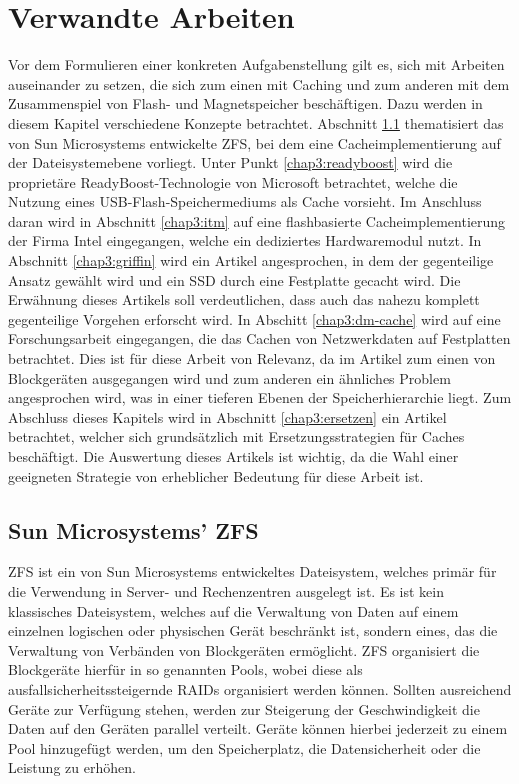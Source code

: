 \chapter{Verwandte Arbeiten}
\label{chap3}

Vor dem Formulieren einer konkreten Aufgabenstellung gilt es, sich mit Arbeiten auseinander zu setzen, die sich zum einen mit Caching und zum anderen mit dem
Zusammenspiel von Flash- und Magnetspeicher beschäftigen. Dazu werden in diesem Kapitel verschiedene Konzepte betrachtet. Abschnitt \ref{chap3:zfs}
thematisiert das von Sun Microsystems entwickelte ZFS, bei dem eine Cacheimplementierung auf der Dateisystemebene vorliegt. Unter Punkt \ref{chap3:readyboost}
wird die proprietäre ReadyBoost-Technologie von Microsoft betrachtet, welche die Nutzung eines USB-Flash-Speichermediums als Cache vorsieht. Im Anschluss daran
wird in Abschnitt \ref{chap3:itm} auf eine flashbasierte Cacheimplementierung der Firma Intel eingegangen, welche ein dediziertes Hardwaremodul nutzt. In
Abschnitt \ref{chap3:griffin} wird ein Artikel angesprochen, in dem der gegenteilige Ansatz gewählt wird und ein \ac{SSD} durch eine Festplatte gecacht wird. Die
Erwähnung dieses Artikels soll verdeutlichen, dass auch das nahezu komplett gegenteilige Vorgehen erforscht wird. In Abschitt \ref{chap3:dm-cache} wird auf eine
Forschungsarbeit eingegangen, die das Cachen von Netzwerkdaten auf Festplatten betrachtet. Dies ist für diese Arbeit von Relevanz, da im Artikel zum einen von
Blockgeräten ausgegangen wird und zum anderen ein ähnliches Problem angesprochen wird, was in einer tieferen Ebenen der Speicherhierarchie liegt. Zum
Abschluss dieses Kapitels wird in Abschnitt \ref{chap3:ersetzen} ein Artikel betrachtet, welcher sich grundsätzlich mit Ersetzungsstrategien für Caches
beschäftigt. Die Auswertung dieses Artikels ist wichtig, da die Wahl einer geeigneten Strategie von erheblicher Bedeutung für diese Arbeit ist.

\section{Sun Microsystems' ZFS}
\label{chap3:zfs}

ZFS ist ein von Sun Microsystems entwickeltes Dateisystem, welches primär für die Verwendung in Server- und Rechenzentren ausgelegt ist. Es ist kein
klassisches Dateisystem, welches auf die Verwaltung von Daten auf einem einzelnen logischen oder physischen Gerät beschränkt ist, sondern eines, das die
Verwaltung von Verbänden von Blockgeräten ermöglicht. ZFS organisiert die Blockgeräte hierfür in so genannten Pools, wobei diese als ausfallsicherheitssteigernde
\acp{RAID} organisiert werden können. Sollten ausreichend Geräte zur Verfügung stehen, werden zur Steigerung der Geschwindigkeit die Daten auf den Geräten
parallel verteilt. Geräte können hierbei jederzeit zu einem Pool hinzugefügt werden, um den Speicherplatz, die Datensicherheit oder die Leistung zu erhöhen.


